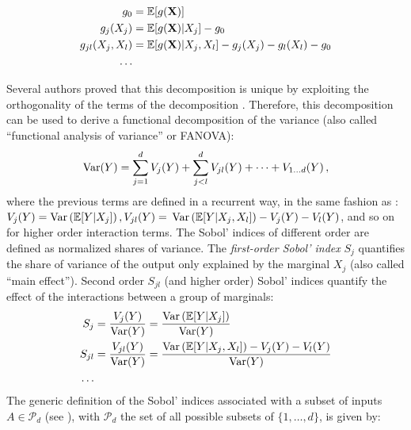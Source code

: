 \begin{subequations}
    \begin{align}
        g_0 &= \mathbb{E}[g({\bf X})]\\
        g_j(X_j) &= \mathbb{E}[g({\bf X}) | X_j] - g_0\\
        g_{jl}(X_j, X_l) &= \mathbb{E}[g({\bf X}) | X_j, X_l] - g_j(X_j) - g_l(X_l) - g_0\\
        \dots
    \end{align}
    \label{eq:hoeffding_terms}
\end{subequations}

Several authors proved that this decomposition is unique by exploiting the orthogonality of the terms of the decomposition \citep{efron_1981,sobol_1993}. 
Therefore, this decomposition can be used to derive a functional decomposition of the variance (also called ``functional analysis of variance'' or FANOVA):
\begin{equation}
    \operatorname{Var}(Y) = \sum_{j=1}^{d} V_j(Y)  + \sum_{j<l}^{d} V_{jl}(Y) + \dots + V_{1 \dots d}(Y)\, , 
    \label{eq:fanova}
\end{equation}
where the previous terms are defined in a recurrent way, in the same fashion as :  $V_j(Y) = \operatorname{Var}\left(\mathbb{E}[Y|X_j]\right), V_{jl}(Y) =$ \allowbreak $\operatorname{Var}\left(\mathbb{E}[Y|X_j, X_l]\right) - V_j(Y) - V_l(Y)$, and so on for higher order interaction terms. 
The Sobol' indices of different order are defined as normalized shares of variance. 
The \textit{first-order Sobol' index} $S_j$ quantifies the share of variance of the output only explained by the marginal $X_j$ (also called ``main effect''). 
Second order $S_{jl}$ (and higher order) Sobol' indices quantify the effect of the interactions between a group of marginals: 
\begin{subequations}
    \begin{align}
        S_j &= \frac{V_j(Y)}{\operatorname{Var}(Y)} = \frac{\operatorname{Var}\left(\mathbb{E}[Y|X_j]\right)}{\operatorname{Var}(Y)}\\
        S_{jl} &= \frac{V_{jl}(Y)}{\operatorname{Var}(Y)} = \frac{\operatorname{Var}\left(\mathbb{E}[Y|X_j, X_l]\right) - V_j(Y) - V_l(Y)}{\operatorname{Var}(Y)}\\
        \dots
        \label{eq:sobol_first}
    \end{align}
\end{subequations}
The generic definition of the Sobol' indices associated with a subset of inputs $A \in \mathcal{P}_d$ (see \citealp{daveiga_iooss_2021}), with $\mathcal{P}_d$ the set of all possible subsets of $\{1, \dots, d\}$, is given by:
